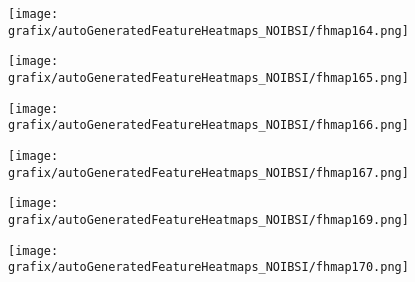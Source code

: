 \hspace{\hsp} 
\begin{subfigure}{\wid\textwidth} 
    \centering 
    \caption{\tiny \sffamily {}} 
    \vspace{\vsp} 
    \texttt{[image: grafix/autoGeneratedFeatureHeatmaps\_NOIBSI/fhmap164.png]} 
\end{subfigure} 
\hspace{\hsp} 
\begin{subfigure}{\wid\textwidth} 
    \centering 
    \caption{\tiny \sffamily {}} 
    \vspace{\vsp} 
    \texttt{[image: grafix/autoGeneratedFeatureHeatmaps\_NOIBSI/fhmap165.png]} 
\end{subfigure} 
\hspace{\hsp} 
\begin{subfigure}{\wid\textwidth} 
    \centering 
    \caption{\tiny \sffamily {}} 
    \vspace{\vsp} 
    \texttt{[image: grafix/autoGeneratedFeatureHeatmaps\_NOIBSI/fhmap166.png]} 
\end{subfigure} 
\hspace{\hsp} 
\begin{subfigure}{\wid\textwidth} 
    \centering 
    \caption{\tiny \sffamily {}} 
    \vspace{\vsp} 
    \texttt{[image: grafix/autoGeneratedFeatureHeatmaps\_NOIBSI/fhmap167.png]} 
\end{subfigure} 
\hspace{\hsp} 
\begin{subfigure}{\wid\textwidth} 
    \centering 
    \caption{\small \sffamily {}} 
\end{subfigure} 
\hspace{\hsp} 
\begin{subfigure}{\wid\textwidth} 
    \centering 
    \caption{\tiny \sffamily {}} 
    \vspace{\vsp} 
    \texttt{[image: grafix/autoGeneratedFeatureHeatmaps\_NOIBSI/fhmap169.png]} 
\end{subfigure} 
\hspace{\hsp} 
\begin{subfigure}{\wid\textwidth} 
    \centering 
    \caption{\tiny \sffamily {}} 
    \vspace{\vsp} 
    \texttt{[image: grafix/autoGeneratedFeatureHeatmaps\_NOIBSI/fhmap170.png]} 
\end{subfigure} 
